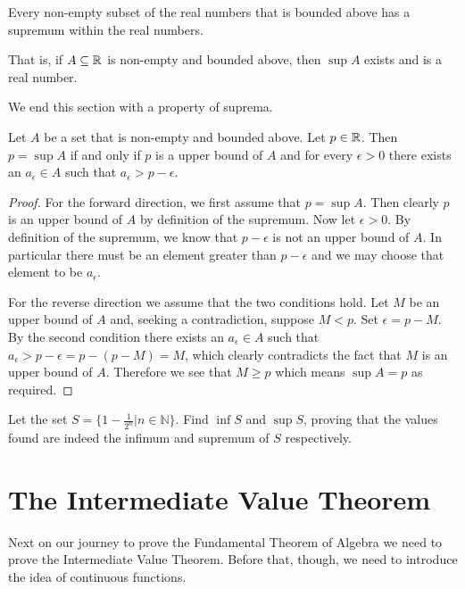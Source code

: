 \begin{axiom}[Completeness]\label{axiom-completeness}
    Every non-empty subset of the real numbers that is bounded above has a supremum within the real numbers.

    That is, if $A \subseteq \mathbb{R}$ is non-empty and bounded above, then $\sup A$ exists and is a real number.
\end{axiom}

We end this section with a property of suprema.
\begin{proposition}\label{prop-identifying-suprema}
    Let $A$ be a set that is non-empty and bounded above. Let $p \in \mathbb{R}$. Then $p = \sup A$ if and only if $p$ is a upper bound of $A$ and for every $\epsilon > 0$ there exists an $a_\epsilon \in A$ such that $a_\epsilon > p - \epsilon$.
\end{proposition}
\begin{proof}
    For the forward direction, we first assume that $p = \sup A$. Then clearly $p$ is an upper bound of $A$ by definition of the supremum. Now let $\epsilon > 0$. By definition of the supremum, we know that $p - \epsilon$ is not an upper bound of $A$. In particular there must be an element greater than $p - \epsilon$ and we may choose that element to be $a_\epsilon$.

    For the reverse direction we assume that the two conditions hold. Let $M$ be an upper bound of $A$ and, seeking a contradiction, suppose $M < p$. Set $\epsilon = p - M$. By the second condition there exists an $a_\epsilon \in A $ such that $a_\epsilon > p - \epsilon = p - (p - M) = M$, which clearly contradicts the fact that $M$ is an upper bound of $A$. Therefore we see that $M \geq p$ which means $\sup A = p$ as required.
\end{proof}

\begin{exercise}
    Let the set $S = \{1 - \frac1{2^n} \vert n \in \mathbb{N}\}$. Find $\inf S$ and $\sup S$, proving that the values found are indeed the infimum and supremum of $S$ respectively.
\end{exercise}

\section{The Intermediate Value Theorem}
Next on our journey to prove the Fundamental Theorem of Algebra we need to prove the Intermediate Value Theorem. Before that, though, we need to introduce the idea of continuous functions.

